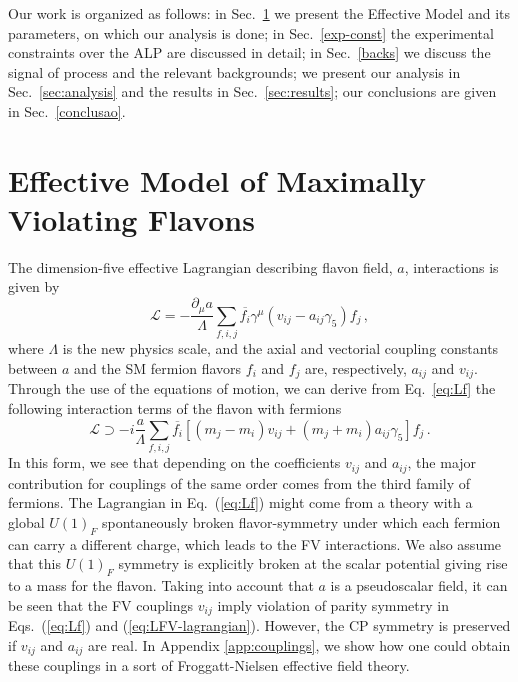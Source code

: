 \documentclass[prd,amsfonts,onecolumn,superscriptaddress,aps,nofootinbib,11pt]{revtex4-1}
\begin{document}
Our work is organized as follows: in Sec.~\ref{sec:model} we present the Effective Model and its parameters, on which our analysis is done; in Sec.~\ref{exp-const} the experimental constraints over the ALP are discussed in detail; in Sec.~\ref{backs} we discuss the signal of process and the relevant backgrounds; we present our analysis in Sec.~\ref{sec:analysis} and the results in Sec.~\ref{sec:results}; our conclusions are given in Sec.~\ref{conclusao}.

\section{Effective Model of Maximally Violating Flavons}
\label{sec:model}

The dimension-five effective Lagrangian describing flavon field, $a$, interactions is given by \cite{Cornella:2019uxs} 
\begin{equation}
    \mathcal{L} = - \frac{\partial_\mu a}{\Lambda} \sum_{f, i, j} \overline{f_i} \gamma^\mu (v_{ij} - a_{ij}\gamma_5) f_j \,,
    \label{eq:Lf}
\end{equation}
where $\Lambda$ is the new physics scale, and the axial and vectorial coupling constants between $a$ and the SM fermion flavors $f_i$ and $f_j$ are, respectively, $a_{ij}$ and $v_{ij}$. Through the use of the equations of motion, we can derive from Eq.~\eqref{eq:Lf} the following interaction terms of the flavon with fermions 
\begin{equation}
\label{eq:LFV-lagrangian}
    \mathcal{L} \supset -i \frac{a}{\Lambda} \sum_{f, i, j} \overline{f_i} \left[ (m_j - m_i) v_{ij} +  (m_j + m_i) a_{ij} \gamma_5 \right] f_j \,.
\end{equation}
In this form, we see that depending on the coefficients $v_{ij}$ and $a_{ij}$, the major contribution for couplings of the same order comes from the third family of fermions. The Lagrangian in Eq.~(\ref{eq:Lf}) might come from a theory with a global $U(1)_F$ spontaneously broken flavor-symmetry under which each fermion can carry a different charge, which leads to the FV interactions. We also assume that this $U(1)_F$ symmetry is explicitly broken at the scalar potential giving rise to a mass for the flavon. Taking into account that $a$ is a pseudoscalar field, it can be seen that the FV couplings $v_{ij}$ imply violation of parity symmetry in Eqs.~(\ref{eq:Lf}) and (\ref{eq:LFV-lagrangian}). However, the CP symmetry is preserved if $v_{ij}$ and $a_{ij}$ are real.  In Appendix \ref{app:couplings}, we show how one could obtain these couplings in a sort of Froggatt-Nielsen effective field theory. 
\end{document}
